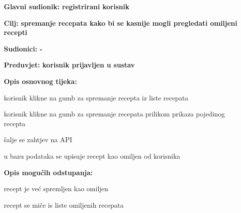 					\noindent {}
					\begin{packed_item}
						\item \textbf{Glavni sudionik: registrirani korisnik}
						\item  \textbf{Cilj: spremanje recepata kako bi se kasnije mogli pregledati omiljeni recepti}
						\item  \textbf{Sudionici: -}
						\item  \textbf{Preduvjet: korisnik prijavljen u sustav}
						
						\item  \textbf{Opis osnovnog tijeka:}
						\item[] \begin{packed_enum}
							\item[1.a] korisnik klikne na gumb za spremanje recepta iz liste recepata
							\item[1.b] korisnik klikne na gumb za spremanje recepata prilikom prikaza pojedinog recepta
							\item[2.] šalje se zahtjev na API
							\item[3.] u bazu podataka se upisuje recept kao omiljen od korisnika
						\end{packed_enum}
						
						\item  \textbf{Opis mogućih odstupanja:}
						\item[] \begin{packed_item}
							\item[10.a] recept je već spremljen kao omiljen
							\begin{packed_enum}
								\item recept se miče is liste omiljenih recepata
							\end{packed_enum}
						\end{packed_item}
					\end{packed_item}
				
				
				
